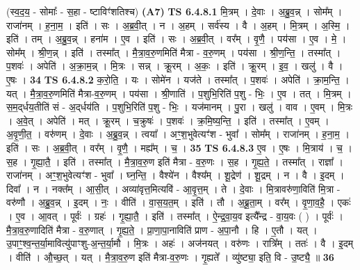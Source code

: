 \documentclass[17pt]{extarticle}
\begin{document}
                  \newline
                      (स्व॒द॒य॒ - सोमाः᳚ - स॒हा - ष्टाविꣳ॑शतिश्च)  \textbf{(A7)} \newline \newline
                                \textbf{ TS 6.4.8.1} \newline
                  मि॒त्रम् । दे॒वाः । अ॒ब्रु॒व॒न्न् । सोम᳚म् । राजा॑नम् । ह॒ना॒म॒ । इति॑ । सः । अ॒ब्र॒वी॒त् । न । अ॒हम् । सर्व॑स्य । वै । अ॒हम् । मि॒त्रम् । अ॒स्मि॒ । इति॑ । तम् । अ॒ब्रु॒व॒न्न् । हना॑म । ए॒व । इति॑ । सः । अ॒ब्र॒वी॒त् । वर᳚म् । वृ॒णै॒ । पय॑सा । ए॒व । मे॒ । सोम᳚म् । श्री॒ण॒न्न् । इति॑ । तस्मा᳚त् । मै॒त्रा॒व॒रु॒णमिति॑ मैत्रा - व॒रु॒णम् । पय॑सा । श्री॒ण॒न्ति॒ । तस्मा᳚त् । प॒शवः॑ । अपेति॑ । अ॒क्रा॒म॒न्न् । मि॒त्रः । सन्न् । क्रू॒रम् । अ॒कः॒ । इति॑ । क्रू॒रम् । इ॒व॒ । खलु॑ । वै । ए॒षः । \textbf{  34} \newline
                  \newline
                                \textbf{ TS 6.4.8.2} \newline
                  क॒रो॒ति॒ । यः । सोमे॑न । यज॑ते । तस्मा᳚त् । प॒शवः॑ । अपेति॑ । क्रा॒म॒न्ति॒ । यत् । मै॒त्रा॒व॒रु॒णमिति॑ मैत्रा-व॒रु॒णम् । पय॑सा । श्री॒णाति॑ । प॒शुभि॒रिति॑ प॒शु - भिः॒ । ए॒व । तत् । मि॒त्रम् । स॒म॒द्‌र्धय॒तीति॑ सं - अ॒द्‌र्धय॑ति । प॒शुभि॒रिति॑ प॒शु - भिः॒ । यज॑मानम् । पु॒रा । खलु॑ । वाव । ए॒वम् । मि॒त्रः । अ॒वे॒त् । अपेति॑ । मत् । क्रू॒रम् । च॒क्रुषः॑ । प॒शवः॑ । क्र॒मि॒ष्य॒न्ति॒ । इति॑ । तस्मा᳚त् । ए॒वम् । अ॒वृ॒णी॒त॒ । वरु॑णम् । दे॒वाः । अ॒ब्रु॒व॒न्न् । त्वया᳚ । अꣳ॒॒श॒भुवेत्यꣳ॑श - भुवा᳚ । सोम᳚म् । राजा॑नम् । ह॒ना॒म॒ । इति॑ । सः । अ॒ब्र॒वी॒त् । वर᳚म् । वृ॒णै॒ । मह्य᳚म् । च॒ । \textbf{  35} \newline
                  \newline
                                \textbf{ TS 6.4.8.3} \newline
                  ए॒व । ए॒षः । मि॒त्राय॑ । च॒ । स॒ह । गृ॒ह्या॒तै॒ । इति॑ । तस्मा᳚त् । मै॒त्रा॒व॒रु॒ण इति॑ मैत्रा - व॒रु॒णः । स॒ह । गृ॒ह्य॒ते॒ । तस्मा᳚त् । राज्ञा᳚ । राजा॑नम् । अꣳ॒॒श॒भुवेत्यꣳ॑श - भुवा᳚ । घ्न॒न्ति॒ । वैश्ये॑न । वैश्य᳚म् । शू॒द्रेण॑ । शू॒द्रम् । न । वै । इ॒दम् । दिवा᳚ । न । नक्त᳚म् । आ॒सी॒त् । अव्या॑वृत्त॒मित्यवि॑ - आ॒वृ॒त्त॒म् । ते । दे॒वाः । मि॒त्रावरु॑णा॒विति॑ मि॒त्रा - वरु॑णौ । अ॒ब्रु॒व॒न्न् । इ॒दम् । नः॒ । वीति॑ । वा॒स॒य॒त॒म् । इति॑ । तौ । अ॒ब्रू॒ता॒म् । वर᳚म् । वृ॒णा॒व॒है॒ । एकः॑ । ए॒व । आ॒वत् । पूर्वः॑ । ग्रहः॑ । गृ॒ह्या॒तै॒ । इति॑ । तस्मा᳚त् । ऐ॒न्द्र॒वा॒य॒व इत्यै᳚न्द्र - वा॒य॒वः ( ) । पूर्वः॑ । मै॒त्रा॒व॒रु॒णादिति॑ मैत्रा - व॒रु॒णात् । गृ॒ह्य॒ते॒ । प्रा॒णा॒पा॒नाविति॑ प्राण - अ॒पा॒नौ । हि । ए॒तौ । यत् । उ॒पाꣳ॒॒श्व॒न्त॒र्या॒मावित्यु॑पाꣳशु-अ॒न्त॒र्या॒मौ । मि॒त्रः । अहः॑ । अज॑नयत् । वरु॑णः । रात्रि᳚म् । ततः॑ । वै । इ॒दम् । वीति॑ । औ॒च्छ॒त् । यत् । मै॒त्रा॒व॒रु॒ण इति॑ मैत्रा-व॒रु॒णः । गृ॒ह्यते᳚ । व्यु॑ष्ट्या॒ इति॒ वि - उ॒ष्ट्यै॒ ॥ \textbf{  36 } \newline
\end{document}
